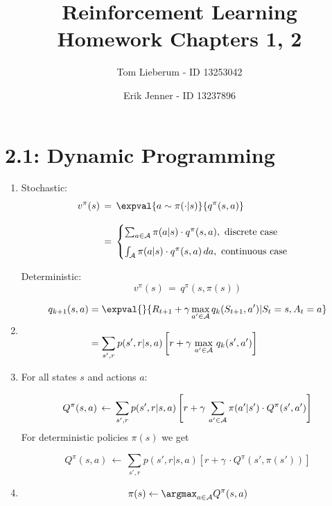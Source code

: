 \documentclass{article}
\title{Reinforcement Learning \\[3mm] Homework Chapters 1, 2}
\author{Tom Lieberum - ID 13253042 \and Erik Jenner - ID 13237896}
\begin{document}
\date{}
\maketitle


\section*{2.1: Dynamic Programming}

\begin{enumerate}[label*=\arabic*.]

\item

Stochastic:
\begin{align*}
v^\pi(s) \,&=\, \expval{a\sim\pi(\cdot|s)}{q^\pi(s,a)}\\[3mm]
\,&=\, 
\begin{cases}
\sum_{a\in\cal A}\pi(a|s) \cdot q^\pi(s,a), \,\, \text{discrete case}\\[2mm]
\int_{\cal A}\pi(a|s) \cdot q^\pi(s,a) \,da, \,\, \text{continuous case}
\end{cases}
\end{align*}


\noindent Deterministic:
\[
v^\pi(s) \,=\,  q^\pi(s,\pi(s))
\]

\item
\begin{align*}
q_{k+1}(s,a) &= \expval{}{R_{t+1} + \gamma \max_{a'\in\cal A} {q_k(S_{t+1},a')} | S_t=s, A_t=a}\\[3mm]
&= \sum_{s',r} p(s',r|s,a)\left[ r + \gamma\, \max_{a' \in \cal A}\,q_{k}(s',a') \right]
\end{align*}


\item
For all states $s$ and actions $a$:

\[
Q^\pi(s,a) \,\leftarrow\, \sum_{s',r}p(s',r|s,a) \left[ r + \gamma\, \sum_{a'\in\cal A} \pi(a'|s')\cdot Q^\pi(s',a') \right]
\]
For deterministic policies $\pi(s)$ we get

\[
Q^\pi(s,a) \,\leftarrow\, \sum_{s',r}p(s',r|s,a) \left[ r + \gamma\, \cdot Q^\pi(s',\pi(s')) \right]
\]

\item
\[
\pi(s) \leftarrow \argmax_{a\in \cal A}Q^{\pi}(s,a)
\]

\end{enumerate}
\end{document}
